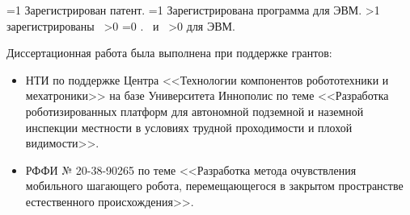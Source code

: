 {\begin{refsection}
        \ifnum \value{citeauthorpatent}=1%
            Зарегистрирован  патент.
        \fi%
        \ifnum \value{citeauthorprogram}=1%
            Зарегистрирована  программа для ЭВМ.
        \fi%
    \fi%
    \ifnum \value{citeregistered}>1%
        зарегистрированы\ %
        \ifnum \value{citeauthorpatent}>0%
        \sloppy%
        \ifnum \value{citeauthorprogram}=0 . \else \ и~\fi%
        \fi%
        \ifnum \value{citeauthorprogram}>0%
         для ЭВМ.
        \fi%
    \fi%
\end{refsection}%
}

Диссертационная работа была выполнена при поддержке грантов:
\begin{itemize}
    \item НТИ по поддержке Центра <<Технологии компонентов робототехники и мехатроники>> на базе Университета Иннополис по теме <<Разработка роботизированных платформ для автономной подземной и наземной инспекции местности в условиях трудной проходимости и плохой видимости>>. 
    \item РФФИ № 20-38-90265 по теме <<Разработка метода очувствления мобильного шагающего робота, перемещающегося в закрытом пространстве естественного происхождения>>.
\end{itemize}


